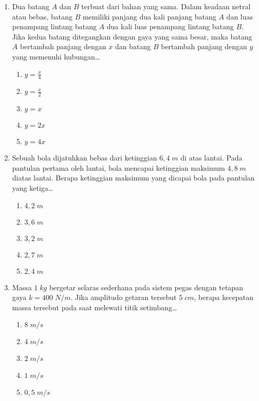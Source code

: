 \documentclass[A4,12PT, english, twocolumn]{journal}
\begin{document}
\begin{enumerate}
    
\newpage
\item Dua batang $A$ dan $B$ terbuat dari bahan yang sama. Dalam keadaan netral atau bebas, batang $B$ memiliki panjang dua kali panjang batang $A$ dan luas penampang lintang batang $A$ dua kali luas penampang lintang batang $B$. Jika kedua batang ditegangkan dengan gaya yang sama besar, maka batang $A$ bertambah panjang dengan $x$ dan batang $B$ bertambah panjang dengan $y$ yang memenuhi hubungan\dots
    \begin{enumerate}
        \item $y=\frac{x}{4}$
        \item $y=\frac{x}{2}$
        \item $y=x$
        \item $y=2x$
        \item $y=4x$
    \end{enumerate}
  
\item Sebuah bola dijatuhkan bebas dari ketinggian $6,4 \; m$ di atas lantai. Pada pantulan pertama oleh lantai, bola mencapai ketinggian maksimum $4,8 \; m$ diatas lantai. Berapa ketinggian maksimum yang dicapai bola pada pantulan yang ketiga\dots
    \begin{enumerate}
        \item $4,2 \; m$
        \item $3,6 \; m$
        \item $3,2 \; m$
        \item $2,7 \; m$
        \item $2,4 \; m$
    \end{enumerate}
     
\item Massa $1 \; kg$ bergetar selaras sederhana pada sistem pegas dengan tetapan gaya $k=400 \; N/m$. Jika amplitudo getaran tersebut $5 \; cm$, berapa kecepatan massa tersebut pada saat melewati titik setimbang\dots
    \begin{enumerate}
        \item $8 \; m/s$
        \item $4 \; m/s$
        \item $2 \; m/s$
        \item $1 \; m/s$
        \item $0,5 \; m/s$
    \end{enumerate}
   

\end{enumerate}
\end{document}
